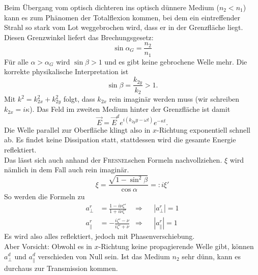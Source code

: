 Beim Übergang vom optisch dichteren ins optisch dünnere Medium ($n_2<n_1$) kann es zum Phänomen der Totalflexion kommen, bei dem ein eintreffender Strahl so stark vom Lot weggebrochen wird, dass er in der Grenzfläche liegt. Diesen Grenzwinkel liefert das Brechungsgesetz:
\begin{equation*}
\sin\alpha_G = \frac{n_2}{n_1}
\end{equation*}
Für alle $\alpha > \alpha_G$ wird $\sin\beta>1$ und es gibt keine gebrochene Welle mehr. Die korrekte physikalische Interpretation ist
\begin{equation*}
\sin\beta=\frac{k_{2y}}{k_2}>1.
\end{equation*}
Mit $k^2=k_{2x}^2+k_{2y}^2$ folgt, dass $k_{2x}$ rein imaginär werden muss (wir schreiben $k_{2x}=i\kappa$). Das Feld im zweiten Medium hinter der Grenzfläche ist damit
\begin{equation*}
\vec{E}=\vec{E}^d e^{i(k_{2y}y-\omega t)}e^{-\kappa t}.
\end{equation*}
Die Welle parallel zur Oberfläche klingt also in $x$-Richtung exponentiell schnell ab. Es findet keine Dissipation statt, stattdessen wird die gesamte Energie reflektiert.\\
Das lässt sich auch anhand der \textsc{Fresnel}schen Formeln nachvollziehen. $\xi$ wird nämlich in dem Fall auch rein imaginär.
\begin{equation*}
\xi = \frac{\sqrt{1-\sin^2\beta}}{\cos\alpha}=:i\xi'
\end{equation*}
So werden die Formeln zu
\begin{align*}
a_\perp^r &=\frac{1-i\nu\zeta'}{1+i\nu\zeta'} &\Rightarrow& &|a_\perp^r|=1\\
a_\parallel^r &= -\frac{i\zeta'-\nu}{i\zeta'+\nu} &\Rightarrow& &|a_\parallel^r|=1
\end{align*}
Es wird also alles reflektiert, jedoch mit Phasenverschiebung. \\
Aber Vorsicht: Obwohl es in $x$-Richtung keine propagierende Welle gibt, können $a_\perp^d$ und $a_\parallel^d$ verschieden von Null sein. Ist das Medium $n_2$ sehr dünn, kann es durchaus zur Transmission kommen.